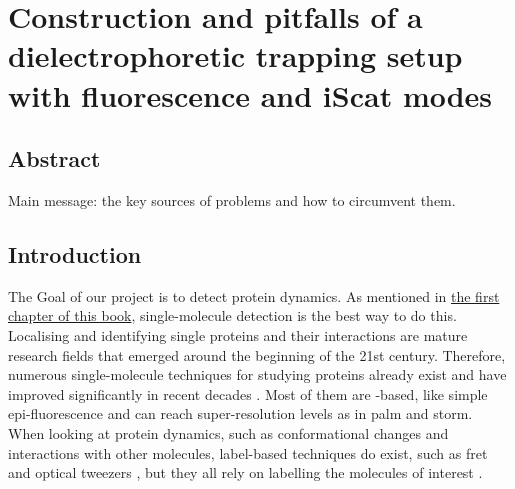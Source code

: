 
\section{Construction and pitfalls of a dielectrophoretic trapping setup with fluorescence and iScat modes}
\label{sec:TroubleShooting}

\subsection*{Abstract}
Main message: the key sources of problems and how to circumvent them. 

\subsection*{Introduction}
\label{sec:intro_trouble}
	The Goal of our project is to detect protein dynamics. As mentioned in \hyperref[cha:introdcuintroduction]{the first chapter of this book}, single-molecule detection is the best way to do this. Localising and identifying single proteins and their interactions are mature research fields that emerged around the beginning of the 21st century.  Therefore, numerous single-molecule techniques for studying proteins already exist and have improved significantly in recent decades \cite{joo2008advances,NobelPrizePressRelease2025}. Most of them are \fl -based, like simple epi-fluorescence and can reach super-resolution levels as in \gls{palm}\cite{hess2006ultra,betzig2006imaging} and \gls{storm}\cite{rust2006sub}. When looking at protein dynamics, such as conformational changes and interactions with other molecules, label-based techniques do exist, such as \gls{fret} \cite{jares2003fret,roy2008practical} and optical tweezers \cite{ashkin1986observation,capitanio2013interrogating}, but they all rely on labelling the molecules of interest \cite{huang2009super,weiss1999fluorescence}. \\ 
